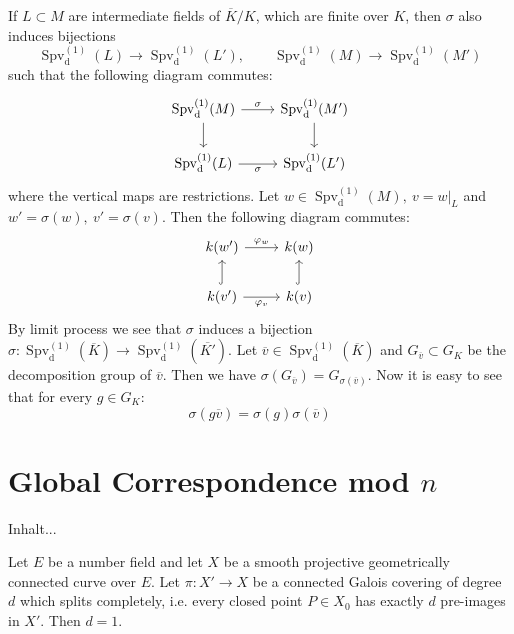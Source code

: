 \begin{remark}\label{3.3}
If $L\subset M$ are intermediate fields of $\overline{K}/K$, which are finite over $K$, then $\sigma$ also induces bijections
\[ \operatorname{Spv}_\text{d}^{(1)}(L) \to \operatorname{Spv}_\text{d}^{(1)}(L'),\qquad \operatorname{Spv}_\text{d}^{(1)}(M) \to \operatorname{Spv}_\text{d}^{(1)}(M') \]
such that the following diagram commutes:
\[\begin{tikzcd}
\operatorname{Spv}_\text{d}^{(1)}(M) \rar["\sigma"]\dar & \operatorname{Spv}_\text{d}^{(1)}(M')\dar\\
\operatorname{Spv}_\text{d}^{(1)}(L) \rar["\sigma"'] & \operatorname{Spv}_\text{d}^{(1)}(L')
\end{tikzcd}\]
where the vertical maps are restrictions. Let $w\in\operatorname{Spv}_\text{d}^{(1)}(M),\ v=w|_L$ and $w'=\sigma(w),\ v'=\sigma(v)$. Then the following diagram commutes:
\[ \begin{tikzcd}
k(w') \rar["\varphi_w"] & k(w)\\
k(v') \rar["\varphi_v"']\uar[hook] & k(v)\uar[hook]
\end{tikzcd} \]
By limit process we see that $\sigma$ induces a bijection $\sigma: \operatorname{Spv}_\text{d}^{(1)}(\overline{K})\to \operatorname{Spv}_\text{d}^{(1)}(\overline{K'})$. Let $\overline{v}\in \operatorname{Spv}_\text{d}^{(1)}(\overline{K})$ and $G_{\overline{v}}\subset G_K$ be the decomposition group of $\overline{v}$. Then we have $\sigma(G_{\overline{v}}) = G_{\sigma(\overline{v})}$. Now it is easy to see that for every $g\in G_K$:
\[ \sigma(g\overline{v}) = \sigma(g)\sigma(\overline{v}) \]
\end{remark}

\section{Global Correspondence mod $n$}

\begin{theorem}\label{hilberts-irreducibility-theorem}
Inhalt...
\end{theorem}

\begin{lemma}\label{4.1}
Let $E$ be a number field and let $X$ be a smooth projective geometrically connected curve over $E$. Let $\pi:X'\to X$ be a connected Galois covering of degree $d$ which splits completely, i.e. every closed point $P\in X_0$ has exactly $d$ pre-images in $X'$. Then $d=1$.
\end{lemma}

